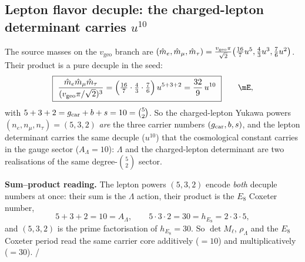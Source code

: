 \subsection{Lepton flavor decuple: the charged-lepton determinant carries $u^{10}$}
The source masses on the $v_{\mathrm{geo}}$ branch are
$(\hat m_e,\hat m_\mu,\hat m_\tau)=\tfrac{v_{\mathrm{geo}}\pi}{\sqrt2}\bigl(\tfrac{16}{7}u^5,\tfrac43u^3,\tfrac76u^2\bigr)$.
Their product is a pure decuple in the seed:
\begin{equation}
  \boxed{\ \frac{\hat m_e\hat m_\mu\hat m_\tau}{(v_{\mathrm{geo}}\pi/\sqrt2)^3}
  =\Bigl(\tfrac{16}{7}\cdot\tfrac43\cdot\tfrac76\Bigr)\,\useed^{5+3+2}
  =\frac{32}{9}\,\useed^{10}\ }\qquad\mE,
\end{equation}
with $5+3+2=g_{\mathrm{car}}+b+s=10=\binom52$. So the charged-lepton Yukawa powers $(n_e,n_\mu,n_\tau)=(5,3,2)$
\emph{are} the three carrier numbers $(g_{\mathrm{car}},b,s)$, and the lepton determinant carries the same
decuple ($u^{10}$) that the cosmological constant carries in the gauge sector ($A_\Lambda=10$):
$\Lambda$ and the charged-lepton determinant are two realisations of the same degree-$\binom52$
sector.

\noindent\textbf{Sum--product reading.} The lepton powers $(5,3,2)$ encode \emph{both} decuple
numbers at once: their sum is the $\Lambda$ action, their product is the $E_8$ Coxeter number,
\begin{equation}
  5+3+2=10=A_\Lambda,\qquad 5\cdot3\cdot2=30=h_{E_8}=2\cdot3\cdot5 ,
\end{equation}
and $(5,3,2)$ is the prime factorisation of $h_{E_8}=30$. So $\det M_\ell$, $\rho_\Lambda$ and the
$E_8$ Coxeter period read the same carrier core additively ($=10$) and multiplicatively ($=30$). \mE/\mC

